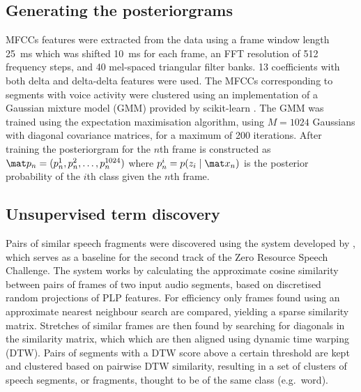 \subsection{Generating the posteriorgrams}
\label{sec:posteriorgrams}
MFCCs features were extracted from the data using a frame window length \SI{25}{\ms} which was shifted \SI{10}{ms} for each frame, an FFT resolution of 512 frequency steps, and 40 mel-spaced triangular filter banks.
13 coefficients with both delta and delta-delta features were used.
The MFCCs corresponding to segments with voice activity were clustered using an implementation of a Gaussian mixture model (GMM) provided by scikit-learn \parencite{scikit-learn}.
The GMM was trained using the expectation maximisation algorithm, using $M = 1024$ Gaussians with diagonal covariance matrices, for a maximum of 200 iterations.
After training the posteriorgram for the $n$th frame is constructed as $\mat p_n = (p_n^1, p_n^2, \dots, p_n^{1024})$ where $p_n^i = p(z_i \mid \mat x_n)$  is the posterior probability of the $i$th class given the $n$th frame.

\subsection{Unsupervised term discovery}
\label{sec:utd}

Pairs of similar speech fragments were discovered using the system developed by \textcite{jansen2011efficient}, which serves as a baseline for the second track of the Zero Resource Speech Challenge.
The system works by calculating the approximate cosine similarity between pairs of frames of two input audio segments, based on discretised random projections of PLP features.
For efficiency only frames found using an approximate nearest neighbour search are compared, yielding a sparse similarity matrix.
Stretches of similar frames are then found by searching for diagonals in the similarity matrix, which which are then aligned using dynamic time warping (DTW).
Pairs of segments with a DTW score above a certain threshold are kept and clustered based on pairwise DTW similarity, resulting in a set of clusters of speech segments, or fragments, thought to be of the same class (e.g.\ word).

